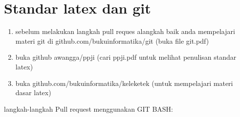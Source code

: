 \section{Standar latex dan git}

\begin{enumerate}
\item sebelum melakukan langkah pull reques alangkah baik anda mempelajari materi git di github.com/bukuinformatika/git (buka file git.pdf)
\item buka github awangga/ppji (cari ppji.pdf untuk melihat penulisan standar latex)
\item buka github.com/bukuinformatika/keleketek (untuk mempelajari materi dasar latex)
\end{enumerate}

 langkah-langkah Pull request menggunakan GIT BASH:
